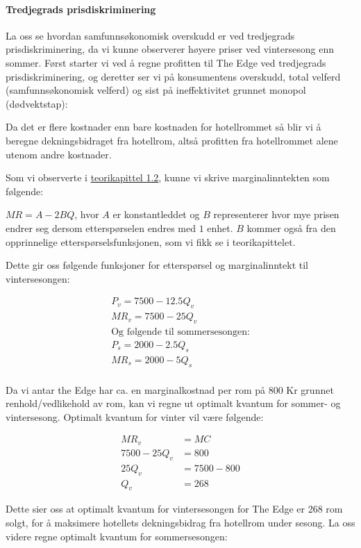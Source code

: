 \documentclass[
  12pt,
  a4paper,
  DIV=11,
  numbers=noendperiod]{scrartcl}
\let\oldparagraph\paragraph
\renewcommand{\paragraph}[1]{\oldparagraph{#1}\mbox{}}
\begin{document}
\paragraph{Tredjegrads
prisdiskriminering}\label{tredjegrads-prisdiskriminering}

La oss se hvordan samfunnsøkonomisk overskudd er ved tredjegrads
prisdiskriminering, da vi kunne observerer høyere priser ved
vintersesong enn sommer. Først starter vi ved å regne profitten til The
Edge ved tredjegrads prisdiskriminering, og deretter ser vi på
konsumentens overskudd, total velferd (samfunnsøkonomisk velferd) og
sist på ineffektivitet grunnet monopol (dødvektstap):

Da det er flere kostnader enn bare kostnaden for hotellrommet så blir vi
å beregne dekningsbidraget fra hotellrom, altså profitten fra
hotellrommet alene utenom andre kostnader.

Som vi observerte i
\href{profittmaksimering-i-en-bedrift-som-har-monopol}{teorikapittel 1.2},
kunne vi skrive marginalinntekten som følgende:

\(MR = A-2BQ\), hvor \(A\) er konstantleddet og \(B\) representerer hvor
mye prisen endrer seg dersom etterspørselen endres med \(1\) enhet.
\(B\) kommer også fra den opprinnelige etterspørselsfunksjonen, som vi
fikk se i teorikapittelet.

Dette gir oss følgende funksjoner for etterspørsel og marginalinntekt
til vintersesongen:

\begin{gather*}
P_v = 7500 - 12.5Q_v \\
MR_v = 7500 - 25Q_v \\
\text{Og følgende til sommersesongen:} \\
P_s = 2000 - 2.5Q_s \\
MR_s = 2000 - 5Q_s \\
\end{gather*}

Da vi antar the Edge har ca. en marginalkostnad per rom på 800 Kr
grunnet renhold/vedlikehold av rom, kan vi regne ut optimalt kvantum for
sommer- og vintersesong. Optimalt kvantum for vinter vil være følgende:

\begin{align*}
MR_v &= MC \\
7500 - 25Q_v &= 800 \\
25Q_v &= 7500 - 800 \\
Q_v &= 268
\end{align*}

Dette sier oss at optimalt kvantum for vintersesongen for The Edge er
268 rom solgt, for å maksimere hotellets dekningsbidrag fra hotellrom
under sesong. La oss videre regne optimalt kvantum for sommersesongen:
\end{document}
